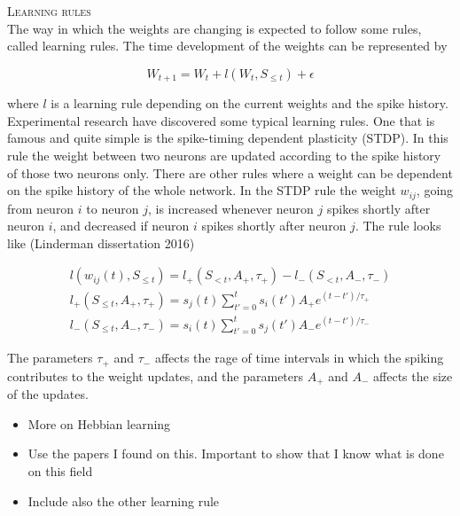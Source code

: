 \textsc{Learning rules}\\
The way in which the weights are changing is expected to follow some rules, called learning rules. The time development of the weights can be represented by

\begin{equation}
    W_{t+1} = W_t + l(W_t, S_{\leq t}) + \epsilon
\end{equation}

where $l$ is a learning rule depending on the current weights and the spike history. Experimental research have discovered some typical learning rules. One that is famous and quite simple is the spike-timing dependent plasticity (STDP). %
In this rule the weight between two neurons are updated according to the spike history of those two neurons only. There are other rules where a weight can be dependent on the spike history of the whole network. In the STDP rule the weight $w_{ij}$, going from neuron $i$ to neuron $j$, is increased whenever neuron $j$ spikes shortly after neuron $i$, and decreased if neuron $i$ spikes shortly after neuron $j$. The rule looks like (Linderman dissertation 2016)

\begin{equation}
    \begin{split}
    l(w_{ij}(t), S_{\leq t}) = l_+(S_{<t}, A_+,\tau_+) - l_-(S_{<t}, A_-,\tau_-)\\ 
    l_+(S_{\leq t}, A_+,\tau_+) = s_j(t) \sum_{t'=0}^{t} s_i(t') A_+ e^{(t-t')/\tau_+}\\ 
    l_-(S_{\leq t}, A_-,\tau_-) = s_i(t) \sum_{t'=0}^{t} s_j(t') A_- e^{(t-t')/\tau_-}
    \end{split}
\end{equation}

The parameters $\tau_+$ and $\tau_-$ affects the rage of time intervals in which the spiking contributes to the weight updates, and the parameters $A_+$ and $A_-$ affects the size of the updates. 

\begin{itemize}
    \item More on Hebbian learning
    \item Use the papers I found on this. Important to show that I know what is done on this field
    \item Include also the other learning rule
\end{itemize}




\cleardoublepage